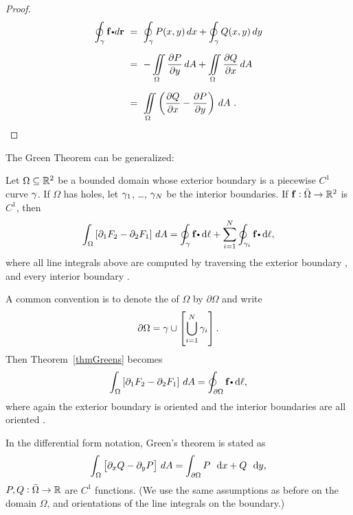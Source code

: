 \begin{proof}
 \begin{align*}
  \olineintvec{\caminho}{f}{r} ~&=~ \oint_\caminho P(x,y)\,dx + \oint_\caminho Q(x,y)\,dy\\[6pt]
   &=~ -\iint\limits_{\Omega} \frac{\partial P}{\partial y}\,dA + \iint\limits_{\Omega} \frac{\partial Q}{\partial x}\,dA\\[6pt]
   &=~ \iint\limits_{\Omega} \left( \frac{\partial Q}{\partial x} - \frac{\partial P}{\partial y} \right)\,dA ~.
 \end{align*}
\end{proof}
  

The Green Theorem can be generalized:
  
  \begin{theorem}\label{thmGreens}
    Let $\Omega \subseteq \mathbb{R}^2$ be a bounded domain whose exterior boundary is a piecewise $C^1$ curve $\gamma$.
    If $\Omega$ has holes, let $\gamma_1$, \dots, $\gamma_N$ be the interior boundaries.
    If $\mathbf{ f}:\bar \Omega  \to \mathbb{R}^2$ is $C^1$, then
    \begin{equation*}
      \dint_\Omega \left[\partial_1 F_2 - \partial_2 F_1\right] \, dA
	= \doint_{\caminho} \funvect{f} \bp \dif \ell + \sum_{i = 1}^N \doint_{\caminho_i} \funvect{f} \bp \dif \ell,
    \end{equation*}
    where all line integrals above are computed by traversing the exterior boundary , and every interior boundary .
  \end{theorem}
  \begin{remark}
    A common convention is to denote the  of $\Omega$ by $\partial \Omega$ and write
    \begin{equation*}
      \partial \Omega = \gamma \cup \left[ \bigcup_{i = 1}^N \gamma_i \right].
    \end{equation*}
    Then Theorem~\ref{thmGreens} becomes
    \begin{equation*}
      \dint_\Omega \left[\partial_1 F_2 - \partial_2 F_1\right] \, dA
	= \doint_{\partial \Omega} \funvect{f} \bp \dif \ell,
    \end{equation*}
    where again the exterior boundary is oriented  and the interior boundaries are all oriented .
  \end{remark}
  \begin{remark}
    In the differential form notation, Green's theorem is stated as
    \begin{equation*}
      \dint_\Omega \left[ \partial_x Q - \partial_y P \right] \, dA
      = \dint_{\partial \Omega} P \, \dx + Q \, \dy,
    \end{equation*}
    $P, Q:\bar \Omega \to \mathbb{R}$ are $C^1$ functions.
    (We use the same assumptions as before on the domain $\Omega$, and orientations of the line integrals on the boundary.)
  \end{remark}
